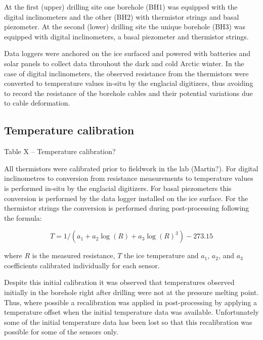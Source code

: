 \documentclass[utf8]{article}
\begin{document}
    At the first (upper) drilling site one borehole (BH1) was equipped with
    the digital inclinometers and the other (BH2) with thermistor strings
    and basal piezometer. At the second (lower) drilling site the unique
    borehole (BH3) was equipped with digital inclinometers, a basal
    piezometer and thermistor strings.

    Data loggers were anchored on the ice surfaced and powered with batteries
    and solar panels to collect data throuhout the dark and cold Arctic winter.
    In the case of digital inclinometers, the observed resistance from the
    thermistors were converted to temperature values in-situ by the englacial
    digitizers, thus avoiding to record the resistance of the borehole cables
    and their potential variations due to cable deformation.


\subsection{Temperature calibration}

    Table X -- Temperature calibration?

    All thermistors were calibrated prior to fieldwork in the lab (Martin?).
    For digital inclinometres to conversion from resistance measurements to
    temperature values is performed in-situ by the englacial digitizers. For
    basal piezometers this conversion is performed by the data logger installed
    on the ice surface. For the thermistor strings the conversion is performed
    during post-processing following the formula:

    \begin{equation}
      T = 1 / (a_1 + a_2 \log(R) + a_3 \log(R)^3) - 273.15
    \end{equation}

    where $R$ is the measured resistance, $T$ the ice temperature and $a_1$,
    $a_2$, and $a_3$ coefficients calibrated individually for each sensor.

    Despite this initial calibration it was observed that temperatures
    observed initially in the borehole right after drilling were not at the
    pressure melting point. Thus, where possible a recalibration was applied in
    post-processing by applying a temperature offset when the initial
    temperature data was available. Unfortunately some of the initial
    temperature data has been lost so that this recalibration was possible for
    some of the sensors only.


\end{document}
